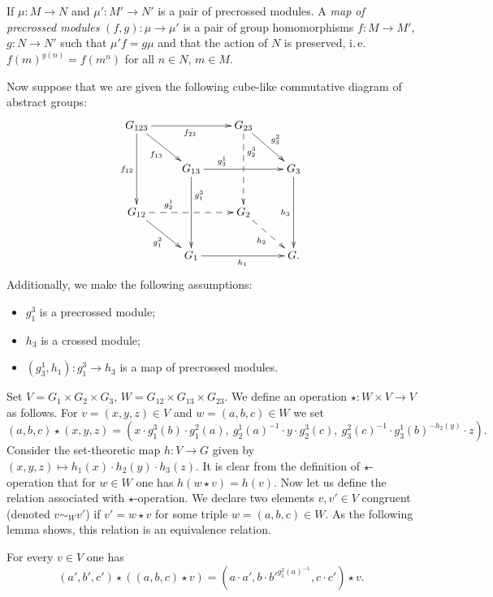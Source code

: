 If $\mu\colon M \to N$ and $\mu' \colon M' \to N'$ is a pair of precrossed modules.
A \textit{map of precrossed modules} $(f, g)\colon \mu \to \mu'$ is a pair of group homomorphisms $f\colon M \to M'$, $g\colon N \to N'$ such that
$\mu'f = g \mu$ and that the action of $N$ is preserved, i.\,e. ${f(m)}^{g(n)} = f(m^n)$ for all $n \in N$, $m \in M$.

Now suppose that we are given the following cube-like commutative diagram of abstract groups:
\begin{equation} \label{eq:cube} \begin{split} \xymatrix{
    G_{123} \ar[rr]_{f_{23}} \ar[dd]_{f_{12}} \ar[rd]_{f_{13}} &                        & G_{23} \ar@{-->}[dd]^(.3){g_2^3} \ar[rd]^{g^2_3} &           \\
    & G_{13} \ar[rr]^(.3){g^1_3} \ar^(.3){g^3_1}[dd] &                   & G_3 \ar[dd]_{h_3} \\
    G_{12} \ar@{-->}[rr]^(.3){g_2^1} \ar[rd]_{g_1^2}          &                        & G_2 \ar@{-->}[rd]_{h_2}         &           \\
    & G_1 \ar[rr]_{h_1}              &                   & G.} \end{split} \end{equation}
Additionally, we make the following assumptions:
\begin{itemize}
    \item $g_1^3$ is a precrossed module;
    \item $h_3$ is a crossed module;
    \item $(g_3^1, h_1) \colon g_1^3 \to h_3$ is a map of precrossed modules.
\end{itemize}
Set $V = G_1 \times G_2 \times G_3$, $W = G_{12} \times G_{13} \times G_{23}$.
We define an operation $\star \colon W \times V \to V$ as follows.
For $v = (x, y, z) \in V$ and $w = (a, b, c) \in W$ we set
\[(a, b, c) \star (x, y, z) = (x \cdot g_1^3(b) \cdot g_1^2(a),\ g_2^1(a)^{-1} \cdot y \cdot g_2^3(c),\ g_3^2(c)^{-1} \cdot g_3^1(b)^{-h_2(y)} \cdot z).\]
Consider the set-theoretic map $h \colon V \to G$ given by $(x, y, z) \mapsto h_1(x) \cdot h_2(y) \cdot h_3(z)$.
It is clear from the definition of $\star$-operation that for $w \in W$ one has $h(w \star v) = h(v).$
Now let us define the relation associated with $\star$-operation.
We declare two elements $v, v' \in V$ congruent (denoted $v \sim_W v'$) if $v' = w \star v$ for some triple $w=(a, b, c) \in W$.
As the following lemma shows, this relation is an equivalence relation.
\begin{lemma} For every $v \in V$ one has
\begin{equation*}(a', b', c') \star \left( (a, b, c) \star v \right) = (a \cdot a', b \cdot {b'}^{g_1^2(a)^{-1}}, c \cdot c') \star v.\end{equation*}
\end{lemma}
